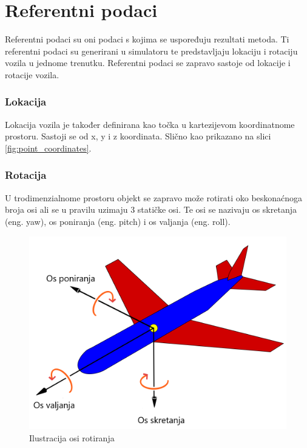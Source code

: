\section{Referentni podaci}

Referentni podaci su oni podaci s kojima se uspoređuju rezultati metoda. Ti referentni podaci su generirani u simulatoru te predstavljaju lokaciju i rotaciju vozila u jednome trenutku. Referentni podaci se zapravo sastoje od lokacije i rotacije vozila.

\subsubsection{Lokacija}
Lokacija vozila je također definirana kao točka u kartezijevom koordinatnome prostoru. Sastoji se od x, y i z koordinata. Slično kao prikazano na slici \ref{fig:point_coordinates}.


\subsubsection{Rotacija}
 U trodimenzialnome prostoru objekt se zapravo može rotirati oko beskonaćnoga broja osi ali se u pravilu uzimaju 3 statičke osi. Te osi se nazivaju os skretanja (eng. yaw), os poniranja (eng. pitch) i os valjanja (eng. roll). 

\begin{figure}[!ht]
  \centering
  \includegraphics[scale=0.3]{images/yaw_roll_pitch_example.png}
  \caption{Ilustracija osi rotiranja}
  \label{fig:yaw_roll_pitch_example}
\end{figure}


